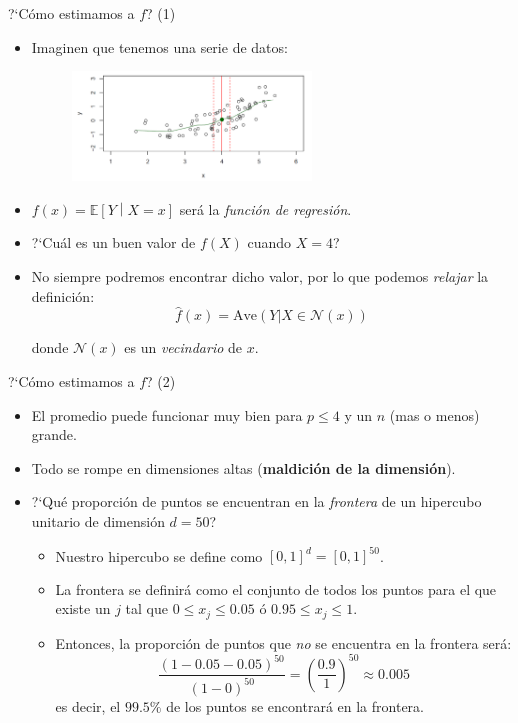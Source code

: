 \documentclass[usenames,dvipsnames]{beamer} %
\newcommand\defi[1]{\textcolor{NavyBlue}{\textit{#1}}}
\begin{document}
\begin{frame}{?`C\'omo estimamos a $f$? (1)}
    \begin{itemize}
        \item Imaginen que tenemos una serie de datos:
        
        \begin{figure}
            \centering
            \includegraphics[width=0.60\textwidth]{images/v_esperado.PNG}
        \end{figure}
        
        \item $f(x)=\mathbb{E}\left[ Y \middle\vert X=x \right]$ ser\'a la \defi{funci\'on de regresi\'on}.
        \item ?`Cu\'al es un buen valor de $f(X)$ cuando $X=4$?
        \item No siempre podremos encontrar dicho valor, por lo que podemos \textit{relajar} la definici\'on:
        $$ \hat{f}(x) = \text{Ave}(Y \vert X \in \mathcal{N}(x)) $$
        
        donde $\mathcal{N}(x)$ es un \textit{vecindario} de $x$.
    \end{itemize}
\end{frame}

\begin{frame}{?`C\'omo estimamos a $f$? (2)}
    \begin{itemize}
        \item El promedio puede funcionar muy bien para $p \leq 4$ y un $n$ (mas o menos) grande.
        \item Todo se rompe en dimensiones altas (\textbf{maldici\'on de la dimensi\'on}).
        \item ?`Qu\'e proporci\'on de puntos se encuentran en la \textit{frontera} de un hipercubo unitario de dimensi\'on $d=50$?
        \begin{itemize}
            \item Nuestro hipercubo se define como $[0, 1]^d=[0,1]^{50}$. 
            \item La frontera se definir\'a como el conjunto de todos los puntos para el que existe un $j$ tal que $0\leq x_j \leq 0.05$ \'o $0.95 \leq x_j \leq 1$.
            \item Entonces, la proporci\'on de puntos que \textit{no} se encuentra en la frontera ser\'a:
            \[ \frac{(1-0.05-0.05)^{50}}{(1-0)^{50}} = \left(\frac{0.9}{1}\right)^{50} \approx 0.005 \]
            es decir, el $99.5\%$ de los puntos se encontrar\'a en la frontera.
        \end{itemize}
    \end{itemize}
\end{frame}
\end{document}
